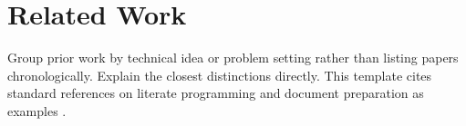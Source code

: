 \section{Related Work}
\label{sec:related-work}

Group prior work by technical idea or problem setting rather than listing papers chronologically. Explain the closest distinctions directly. This template cites standard references on literate programming and document preparation as examples \citep{knuth1984literate,lamport1994latex}.
